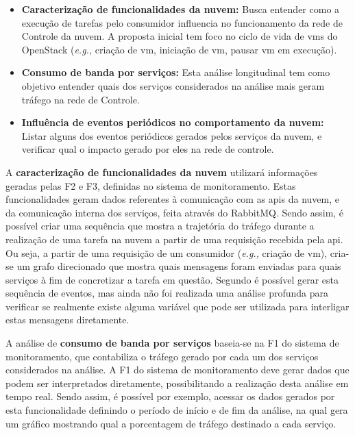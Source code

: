 \begin{itemize}
	\item \textbf{Caracterização de funcionalidades da nuvem:} Busca entender como a execução de tarefas pelo consumidor influencia no funcionamento da rede de Controle da nuvem. 
	A proposta inicial tem foco no ciclo de vida de \acp{vm} do OpenStack (\textit{e.g.,} criação de \ac{vm}, iniciação de \ac{vm}, pausar \ac{vm} em execução).
	
	\item \textbf{Consumo de banda por serviços:} Esta análise longitudinal tem como objetivo entender quais dos serviços considerados na análise mais geram tráfego na rede de Controle.
	
	\item \textbf{Influência de eventos periódicos no comportamento da nuvem:} Listar alguns dos eventos periódicos gerados pelos serviços da nuvem, e verificar qual o impacto gerado por eles na rede de controle. 
\end{itemize}

A \textbf{caracterização de funcionalidades da nuvem} utilizará informações geradas pelas F2 e F3, definidas no sistema de monitoramento.
%
Estas funcionalidades geram dados referentes à comunicação com as \acp{api} da nuvem, e da comunicação interna dos serviços, feita através do RabbitMQ.
%
Sendo assim, é possível criar uma sequência que mostra a trajetória do tráfego durante a realização de uma tarefa na nuvem a partir de uma requisição recebida pela \ac{api}.
%
Ou seja, a partir de uma requisição de um consumidor (\textit{e.g., } criação de \ac{vm}), cria-se um grafo direcionado que mostra quais mensagens foram enviadas para quais serviços à fim de concretizar a tarefa em questão.
%
Segundo \cite{sharma:2015:hansel} é possível gerar esta sequência de eventos, mas ainda não foi realizada uma análise profunda para verificar se realmente existe alguma variável que pode ser utilizada para interligar estas mensagens diretamente.

A análise de \textbf{consumo de banda por serviços} baseia-se na F1 do sistema de monitoramento, que contabiliza o tráfego gerado por cada um dos serviços considerados na análise.
%
A F1 do sistema de monitoramento deve gerar dados que podem ser interpretados diretamente, possibilitando a realização desta análise em tempo real.
%
Sendo assim, é possível por exemplo, acessar os dados gerados por esta funcionalidade definindo o período de início e de fim da análise, na qual gera um gráfico mostrando qual a porcentagem de tráfego destinado a cada serviço.

